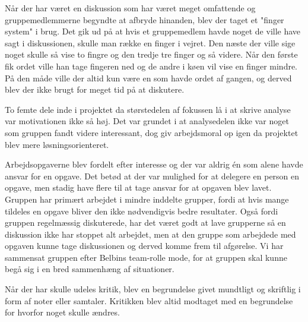 Når der har været en diskussion som har været meget omfattende og gruppemedlemmerne begyndte at afbryde hinanden, blev der taget et "finger system" i brug. Det gik ud på at hvis et gruppemedlem havde noget de ville have sagt i diskussionen, skulle man række en finger i vejret. Den næste der ville sige noget skulle så vise to fingre og den tredje tre finger og så videre. Når den første fik ordet ville han tage fingeren ned og de andre i køen vil vise en finger mindre. På den måde ville der altid kun være en som havde ordet af gangen, og derved blev der ikke brugt for meget tid på at diskutere.

To femte dele inde i projektet da størstedelen af fokussen lå i at skrive analyse var motivationen ikke så høj. Det var grundet i at analysedelen ikke var noget som gruppen fandt videre interessant, dog giv arbejdsmoral op igen da projektet blev mere løsningsorienteret.

Arbejdsopgaverne blev fordelt efter interesse og der var aldrig én som alene havde ansvar for en opgave. Det betød at der var mulighed for at delegere en person en opgave, men stadig have flere til at tage ansvar for at opgaven blev lavet.
Gruppen har primært arbejdet i mindre inddelte grupper, fordi at hvis mange tildeles en opgave bliver den ikke nødvendigvis bedre resultater. Også fordi gruppen regelmæssig diskuterede, har det været godt at lave grupperne så en diskussion ikke har stoppet alt arbejdet, men at den gruppe som arbejdede med opgaven kunne tage diskussionen og derved komme frem til afgørelse. Vi har sammensat gruppen efter Belbins team-rolle mode, for at gruppen skal kunne begå sig i en bred sammenhæng af situationer. 

Når der har skulle udeles kritik, blev en begrundelse givet mundtligt og skriftlig i form af noter eller samtaler. Kritikken blev altid modtaget med en begrundelse for hvorfor noget skulle ændres.